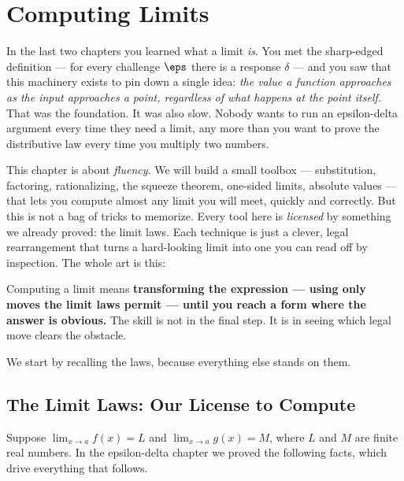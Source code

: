 \chapter{Computing Limits}

In the last two chapters you learned what a limit \emph{is}. You met the
sharp-edged definition --- for every challenge $\eps$ there is a
response $\delta$ --- and you saw that this machinery exists to pin down a
single idea: \emph{the value a function approaches as the input approaches a
point, regardless of what happens at the point itself.} That was the
foundation. It was also slow. Nobody wants to run an epsilon-delta argument
every time they need a limit, any more than you want to prove the
distributive law every time you multiply two numbers.

This chapter is about \emph{fluency}. We will build a small toolbox ---
substitution, factoring, rationalizing, the squeeze theorem, one-sided limits,
absolute values --- that lets you compute almost any limit you will meet,
quickly and correctly. But this is not a bag of tricks to memorize. Every
tool here is \emph{licensed} by something we already proved: the limit laws.
Each technique is just a clever, legal rearrangement that turns a hard-looking
limit into one you can read off by inspection. The whole art is this:

\begin{focusbox}
Computing a limit means \textbf{transforming the expression --- using only
moves the limit laws permit --- until you reach a form where the answer is
obvious.} The skill is not in the final step. It is in seeing which legal move
clears the obstacle.
\end{focusbox}

We start by recalling the laws, because everything else stands on them.

\section{The Limit Laws: Our License to Compute}
\label{ch07:laws}

Suppose $\displaystyle\lim_{x\to a} f(x) = L$ and
$\displaystyle\lim_{x\to a} g(x) = M$, where $L$ and $M$ are finite real
numbers. In the epsilon-delta chapter we proved the following facts, which
drive everything that follows.

